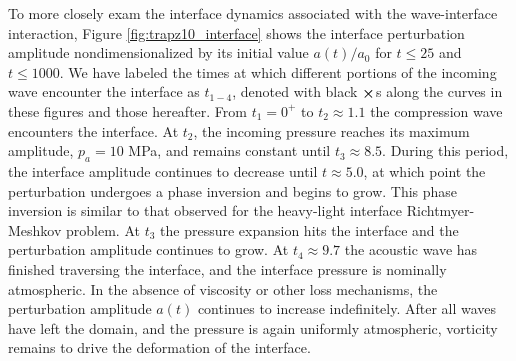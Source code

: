 % 
To more closely exam the interface dynamics associated with the
wave-interface interaction, Figure \ref{fig:trapz10_interface} shows
the interface perturbation amplitude nondimensionalized by its initial
value $a(t)/a_0$ for $t\leq25$ and $t\leq1000$. We have labeled the times at which
different portions of the incoming wave encounter the interface as
$t_{1-4}$, denoted with black $\boldsymbol{\times}$s along the curves in these
figures and those hereafter. From $t_1=0^+$ to $t_2\approx1.1$ the
compression wave encounters the interface. At $t_2$, the incoming
pressure reaches its maximum amplitude, $p_a=10$ MPa, and remains
constant until $t_3\approx8.5$. During this period, the interface
amplitude continues to decrease until $t\approx 5.0$, at which point
the perturbation undergoes a phase inversion and begins to grow. This
phase inversion is similar to that observed for the heavy-light
interface Richtmyer-Meshkov problem. At $t_3$ the pressure expansion
hits the interface and the perturbation amplitude continues to
grow. At $t_4\approx9.7$ the acoustic wave has finished traversing the
interface, and the interface pressure is nominally atmospheric. In the
absence of viscosity or other loss mechanisms, the perturbation
amplitude $a(t)$ continues to increase indefinitely. After all waves
have left the domain, and the pressure is again uniformly atmospheric,
vorticity remains to drive the deformation of the interface.
% 
% 
